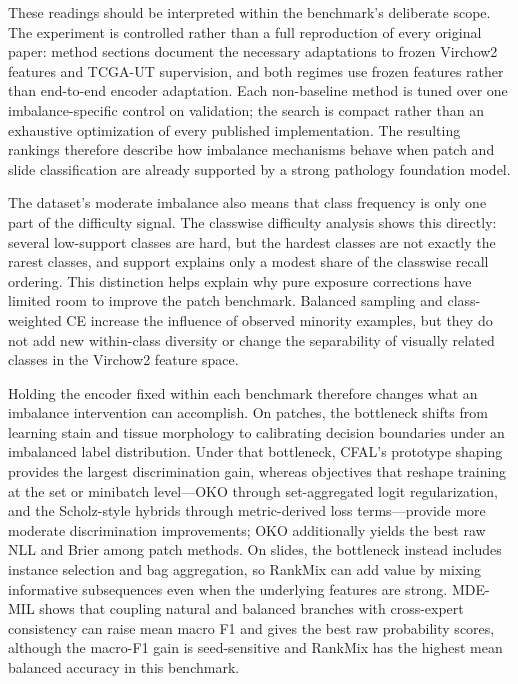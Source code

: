 \documentclass[11pt]{article}
\begin{document}
These readings should be interpreted within the benchmark's deliberate scope. The experiment is controlled rather than a full reproduction of every original paper: method sections document the necessary adaptations to frozen Virchow2 features and TCGA-UT supervision, and both regimes use frozen features rather than end-to-end encoder adaptation. Each non-baseline method is tuned over one imbalance-specific control on validation; the search is compact rather than an exhaustive optimization of every published implementation. The resulting rankings therefore describe how imbalance mechanisms behave when patch and slide classification are already supported by a strong pathology foundation model.

The dataset's moderate imbalance also means that class frequency is only one part of the difficulty signal. The classwise difficulty analysis shows this directly: several low-support classes are hard, but the hardest classes are not exactly the rarest classes, and support explains only a modest share of the classwise recall ordering. This distinction helps explain why pure exposure corrections have limited room to improve the patch benchmark. Balanced sampling and class-weighted CE increase the influence of observed minority examples, but they do not add new within-class diversity or change the separability of visually related classes in the Virchow2 feature space.

Holding the encoder fixed within each benchmark therefore changes what an imbalance intervention can accomplish. On patches, the bottleneck shifts from learning stain and tissue morphology to calibrating decision boundaries under an imbalanced label distribution. Under that bottleneck, CFAL's prototype shaping provides the largest discrimination gain, whereas objectives that reshape training at the set or minibatch level---OKO through set-aggregated logit regularization, and the Scholz-style hybrids through metric-derived loss terms---provide more moderate discrimination improvements; OKO additionally yields the best raw NLL and Brier among patch methods. On slides, the bottleneck instead includes instance selection and bag aggregation, so RankMix can add value by mixing informative subsequences even when the underlying features are strong. MDE-MIL shows that coupling natural and balanced branches with cross-expert consistency can raise mean macro F1 and gives the best raw probability scores, although the macro-F1 gain is seed-sensitive and RankMix has the highest mean balanced accuracy in this benchmark.
\end{document}
